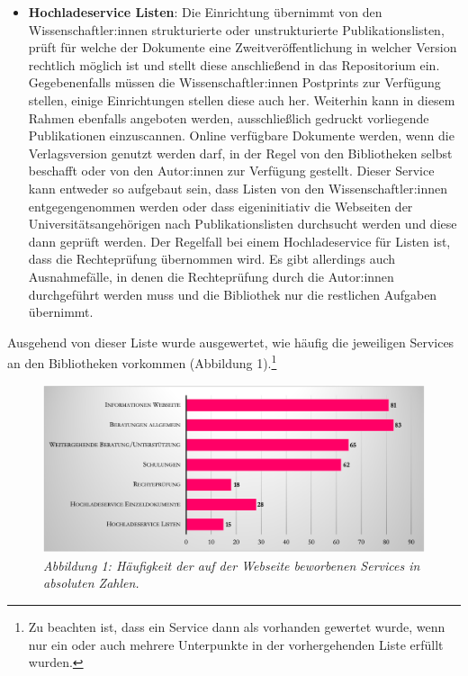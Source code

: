 \documentclass[a4paper,
fontsize=11pt,
oneside,
numbers=noperiodatend,
parskip=half-,
bibliography=totoc,
final
]{scrartcl}
\begin{document}
\begin{itemize}
{    Anbindung an DeepGreen erfolgen.} Anzumerken ist, dass das
  eigenständige Hochladen an manchen Bibliotheken nicht vorgesehen ist.
\item
  \textbf{Hochladeservice Listen}: Die Einrichtung übernimmt von den
  Wissenschaftler:innen strukturierte oder unstrukturierte
  Publikationslisten, prüft für welche der Dokumente eine
  Zweitveröffentlichung in welcher Version rechtlich möglich ist und
  stellt diese anschließend in das Repositorium ein. Gegebenenfalls
  müssen die Wissenschaftler:innen Postprints zur Verfügung stellen,
  einige Einrichtungen stellen diese auch her. Weiterhin kann in diesem
  Rahmen ebenfalls angeboten werden, ausschließlich gedruckt vorliegende
  Publikationen einzuscannen. Online verfügbare Dokumente werden, wenn
  die Verlagsversion genutzt werden darf, in der Regel von den
  Bibliotheken selbst beschafft oder von den Autor:innen zur Verfügung
  gestellt. Dieser Service kann entweder so aufgebaut sein, dass Listen
  von den Wissenschaftler:innen entgegengenommen werden oder dass
  eigeninitiativ die Webseiten der Universitätsangehörigen nach
  Publikationslisten durchsucht werden und diese dann geprüft werden.
  Der Regelfall bei einem Hochladeservice für Listen ist, dass die
  Rechteprüfung übernommen wird. Es gibt allerdings auch Ausnahmefälle,
  in denen die Rechteprüfung durch die Autor:innen durchgeführt werden
  muss und die Bibliothek nur die restlichen Aufgaben übernimmt.
\end{itemize}

Ausgehend von dieser Liste wurde ausgewertet, wie häufig die jeweiligen
Services an den Bibliotheken vorkommen (Abbildung 1).\footnote{Zu
  beachten ist, dass ein Service dann als vorhanden gewertet wurde, wenn
  nur ein oder auch mehrere Unterpunkte in der vorhergehenden Liste
  erfüllt wurden.}

\begin{figure}[h!]
\centering
\includegraphics[width=.9\textwidth]{img/abb1.png}
\caption{\textit{Abbildung 1: Häufigkeit der auf der Webseite beworbenen
Services in absoluten Zahlen.}}
\end{figure}
\end{document}
